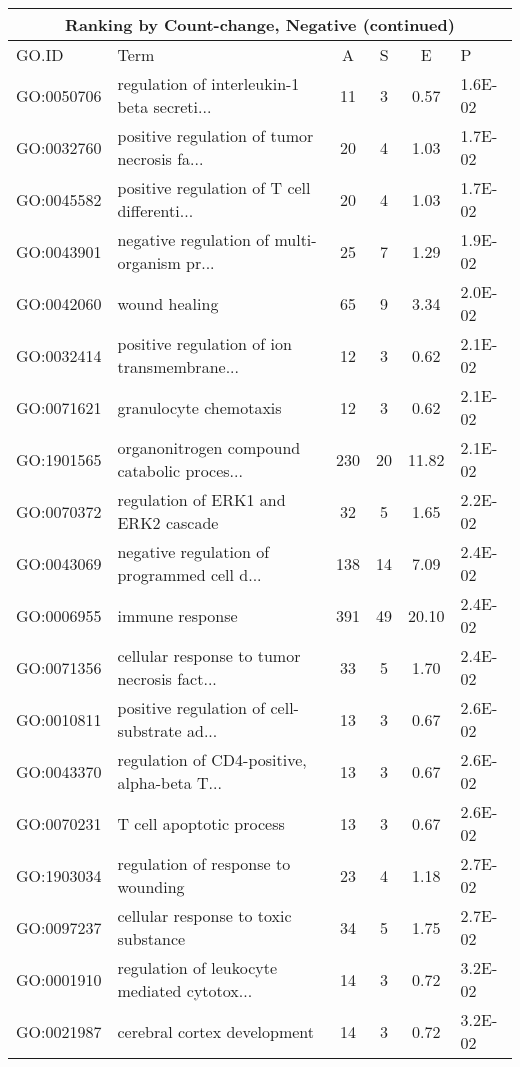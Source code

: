 \begin{table}  
\begin{tabular}{llcccl}
\multicolumn{6}{c}{\bf Ranking by Count-change, Negative (continued)} \\
  \hline
GO.ID & Term & A & S & E & P \\ 
  \hline
  GO:0050706 & regulation of interleukin-1 beta secreti... &  11 &   3 & 0.57 & 1.6E-02 \\ 
  GO:0032760 & positive regulation of tumor necrosis fa... &  20 &   4 & 1.03 & 1.7E-02 \\ 
  GO:0045582 & positive regulation of T cell differenti... &  20 &   4 & 1.03 & 1.7E-02 \\ 
  GO:0043901 & negative regulation of multi-organism pr... &  25 &   7 & 1.29 & 1.9E-02 \\ 
  GO:0042060 & wound healing &  65 &   9 & 3.34 & 2.0E-02 \\ 
  GO:0032414 & positive regulation of ion transmembrane... &  12 &   3 & 0.62 & 2.1E-02 \\ 
  GO:0071621 & granulocyte chemotaxis &  12 &   3 & 0.62 & 2.1E-02 \\ 
  GO:1901565 & organonitrogen compound catabolic proces... & 230 &  20 & 11.82 & 2.1E-02 \\ 
  GO:0070372 & regulation of ERK1 and ERK2 cascade &  32 &   5 & 1.65 & 2.2E-02 \\ 
  GO:0043069 & negative regulation of programmed cell d... & 138 &  14 & 7.09 & 2.4E-02 \\ 
  GO:0006955 & immune response & 391 &  49 & 20.10 & 2.4E-02 \\ 
  GO:0071356 & cellular response to tumor necrosis fact... &  33 &   5 & 1.70 & 2.4E-02 \\ 
  GO:0010811 & positive regulation of cell-substrate ad... &  13 &   3 & 0.67 & 2.6E-02 \\ 
  GO:0043370 & regulation of CD4-positive, alpha-beta T... &  13 &   3 & 0.67 & 2.6E-02 \\ 
  GO:0070231 & T cell apoptotic process &  13 &   3 & 0.67 & 2.6E-02 \\ 
  GO:1903034 & regulation of response to wounding &  23 &   4 & 1.18 & 2.7E-02 \\ 
  GO:0097237 & cellular response to toxic substance &  34 &   5 & 1.75 & 2.7E-02 \\ 
  GO:0001910 & regulation of leukocyte mediated cytotox... &  14 &   3 & 0.72 & 3.2E-02 \\ 
  GO:0021987 & cerebral cortex development &  14 &   3 & 0.72 & 3.2E-02 \\ 

\end{tabular}
\end{table}
